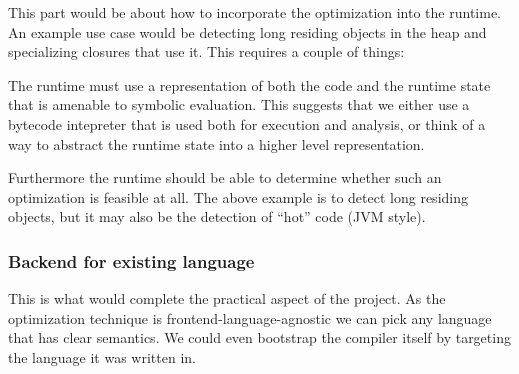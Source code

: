 \documentclass[a4paper]{article}
\begin{document}
This part would be about how to incorporate the optimization into the runtime. An example use case would be detecting long residing objects in the heap and specializing closures that use it. This requires a couple of things:

The runtime must use a representation of both the code and the runtime state that is amenable to symbolic evaluation. This suggests that we either use a bytecode intepreter that is used both for execution and analysis, or think of a way to abstract the runtime state into a higher level representation.

Furthermore the runtime should be able to determine whether such an optimization is feasible at all. The above example is to detect long residing objects, but it may also be the detection of ``hot'' code (JVM style).

\subsubsection*{Backend for existing language}

This is what would complete the practical aspect of the project. As the optimization technique is frontend-language-agnostic we can pick any language that has clear semantics. We could even bootstrap the compiler itself by targeting the language it was written in.



\end{document}
